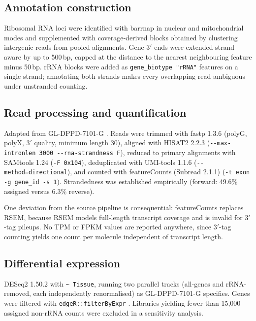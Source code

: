 \subsection{Annotation construction}
Ribosomal RNA loci were identified with barrnap \cite{seemann2013barrnap} in nuclear and
mitochondrial modes and supplemented with coverage-derived blocks obtained by clustering
intergenic reads from pooled alignments. Gene 3$'$ ends were extended strand-aware by up to
500\,bp, capped at the distance to the nearest neighbouring feature minus 50\,bp. rRNA blocks
were added as \texttt{gene\_biotype "rRNA"} features on a single strand; annotating both
strands makes every overlapping read ambiguous under unstranded counting.

\subsection{Read processing and quantification}
Adapted from GL-DPPD-7101-G \cite{genelab7101G}. Reads were trimmed with fastp 1.3.6
\cite{chen2018fastp} (polyG, polyX, 3$'$ quality, minimum length 30), aligned with HISAT2 2.2.3
\cite{kim2019hisat2} (\texttt{-{}-max-intronlen 3000 -{}-rna-strandness F}), reduced to primary
alignments with SAMtools 1.24 \cite{danecek2021samtools} (\texttt{-F 0x104}),
deduplicated with UMI-tools 1.1.6 \cite{smith2017umitools}
(\texttt{-{}-method=directional}), and counted with featureCounts (Subread 2.1.1)
\cite{liao2014featurecounts} (\texttt{-t exon -g gene\_id -s 1}). Strandedness was established
empirically (forward: 49.6\% assigned versus 6.3\% reverse).

One deviation from the source pipeline is consequential: featureCounts replaces RSEM, because
RSEM models full-length transcript coverage and is invalid for 3$'$-tag pileups. No TPM or FPKM
values are reported anywhere, since 3$'$-tag counting yields one count per molecule independent
of transcript length.

\subsection{Differential expression}
DESeq2 1.50.2 \cite{love2014deseq2} with \verb|~ Tissue|, running two parallel tracks
(all-genes and rRNA-removed, each independently renormalised) as GL-DPPD-7101-G specifies.
Genes were filtered with \texttt{edgeR::filterByExpr} \cite{robinson2010edger}. Libraries
yielding fewer than 15,000 assigned non-rRNA counts were excluded in a sensitivity analysis.

